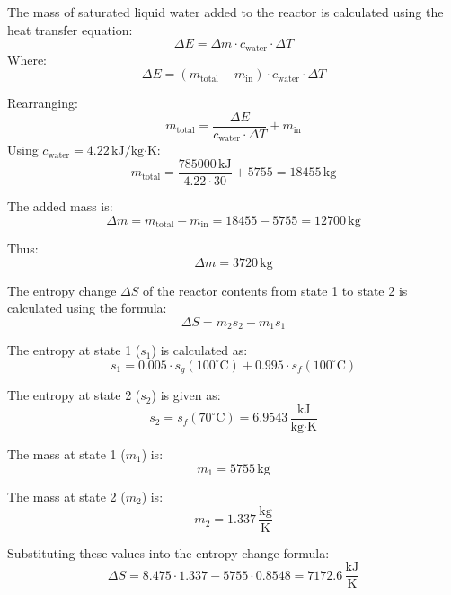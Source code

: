 The mass of saturated liquid water added to the reactor is calculated using the heat transfer equation:  
\[
\Delta E = \Delta m \cdot c_{\text{water}} \cdot \Delta T
\]  
Where:  
\[
\Delta E = (m_{\text{total}} - m_{\text{in}}) \cdot c_{\text{water}} \cdot \Delta T
\]  

Rearranging:  
\[
m_{\text{total}} = \frac{\Delta E}{c_{\text{water}} \cdot \Delta T} + m_{\text{in}}
\]  
Using \( c_{\text{water}} = 4.22 \, \text{kJ/kg·K} \):  
\[
m_{\text{total}} = \frac{785000 \, \text{kJ}}{4.22 \cdot 30} + 5755 = 18455 \, \text{kg}
\]  

The added mass is:  
\[
\Delta m = m_{\text{total}} - m_{\text{in}} = 18455 - 5755 = 12700 \, \text{kg}
\]  

Thus:  
\[
\Delta m = 3720 \, \text{kg}
\]

The entropy change \( \Delta S \) of the reactor contents from state 1 to state 2 is calculated using the formula:  
\[
\Delta S = m_2 s_2 - m_1 s_1
\]

The entropy at state 1 (\( s_1 \)) is calculated as:  
\[
s_1 = 0.005 \cdot s_g(100^\circ\text{C}) + 0.995 \cdot s_f(100^\circ\text{C})
\]

The entropy at state 2 (\( s_2 \)) is given as:  
\[
s_2 = s_f(70^\circ\text{C}) = 6.9543 \, \frac{\text{kJ}}{\text{kg·K}}
\]

The mass at state 1 (\( m_1 \)) is:  
\[
m_1 = 5755 \, \text{kg}
\]

The mass at state 2 (\( m_2 \)) is:  
\[
m_2 = 1.337 \, \frac{\text{kg}}{\text{K}}
\]

Substituting these values into the entropy change formula:  
\[
\Delta S = 8.475 \cdot 1.337 - 5755 \cdot 0.8548 = 7172.6 \, \frac{\text{kJ}}{\text{K}}
\]